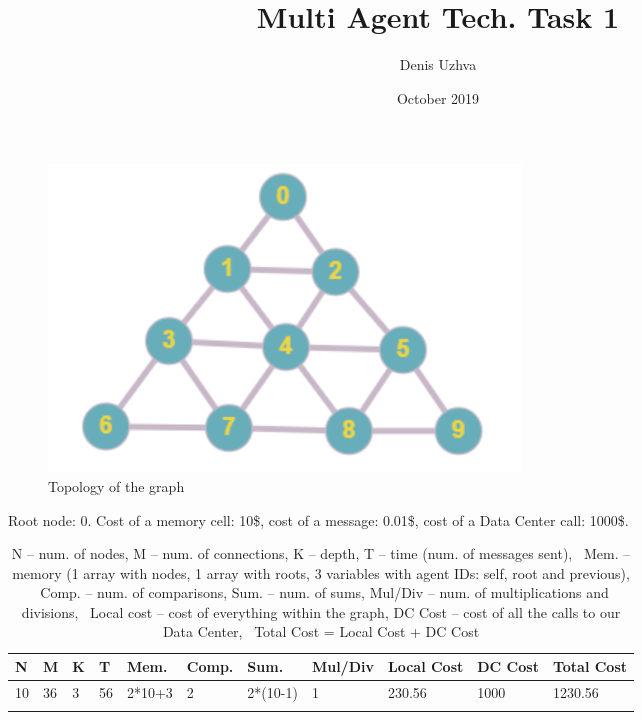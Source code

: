 \documentclass{article}
\begin{document}
\title{Multi Agent Tech. Task 1}
\author{Denis Uzhva}
\date{October 2019}
\maketitle

\begin{figure}[H]
    \centering
    \includegraphics[width=.6\textwidth]{triangleTen.png}
    \caption{Topology of the graph}
    \label{fig:gr}
\end{figure}

Root node: 0. Cost of a memory cell: 10\$, cost of a message: 0.01\$, cost of a Data Center call: 1000\$.

\begin{scriptsize}
\begin{longtable}{lllllllllll}
	\toprule
	N	&	M	&	K	&	T	&	Mem.	&	Comp.	&	Sum.		&	Mul/Div	&	Local Cost	&	DC Cost	&	Total Cost	\\
	\midrule
	10	&	36	&	3	&	56	&	2*10+3	&	2		&	2*(10-1)	&	1		&	230.56		&	1000	&	1230.56		\\
    \bottomrule
	\caption{N -- num. of nodes, M -- num. of connections, K -- depth, T -- time (num. of messages sent), \
		Mem. -- memory (1 array with nodes, 1 array with roots, 3 variables with agent IDs: self, root and previous), \
		Comp. -- num. of comparisons, Sum. -- num. of sums, Mul/Div -- num. of multiplications and divisions, \
		Local cost -- cost of everything within the graph, DC Cost -- cost of all the calls to our Data Center, \
		Total Cost = Local Cost + DC Cost}
	\label{tab:acc}
\end{longtable}
\end{scriptsize}
\end{document}

